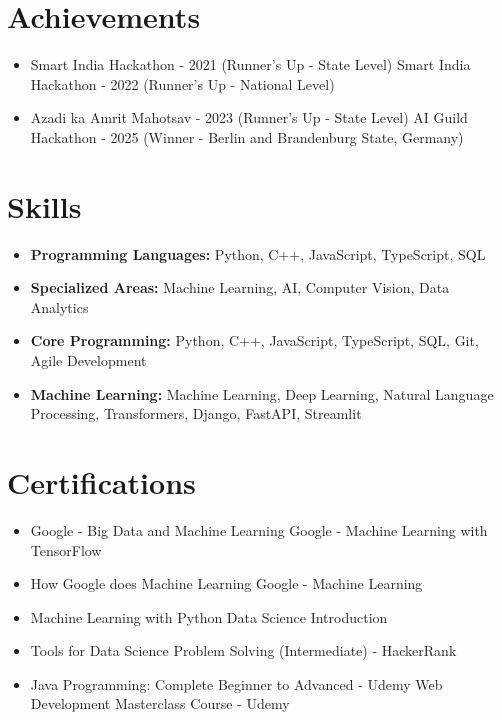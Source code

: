 \documentclass[a4paper,10pt]{article}
\begin{document}
\section*{Achievements}
\begin{itemize}
\item Smart India Hackathon - 2021 (Runner's Up - State Level) \hfill Smart India Hackathon - 2022 (Runner's Up - National Level)
\item Azadi ka Amrit Mahotsav - 2023 (Runner's Up - State Level) \hfill AI Guild Hackathon - 2025 (Winner - Berlin and Brandenburg State, Germany)
\end{itemize}

\section*{Skills}
\begin{itemize}
  \item \textbf{Programming Languages:} Python, C++, JavaScript, TypeScript, SQL
  \item \textbf{Specialized Areas:} Machine Learning, AI, Computer Vision, Data Analytics
  \item \textbf{Core Programming:} Python, C++, JavaScript, TypeScript, SQL, Git, Agile Development
  \item \textbf{Machine Learning:} Machine Learning, Deep Learning, Natural Language Processing, Transformers, Django, FastAPI, Streamlit
\end{itemize}

\section*{Certifications}
\begin{itemize}
\item Google - Big Data and Machine Learning \hfill Google - Machine Learning with TensorFlow
\item How Google does Machine Learning \hfill Google - Machine Learning
\item Machine Learning with Python \hfill Data Science Introduction
\item Tools for Data Science \hfill Problem Solving (Intermediate) - HackerRank
\item Java Programming: Complete Beginner to Advanced - Udemy \hfill Web Development Masterclass Course - Udemy
\end{itemize}
\end{document}
